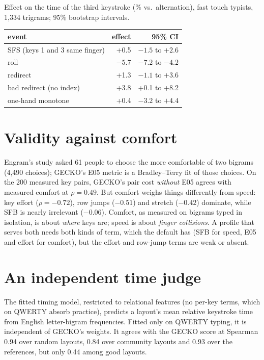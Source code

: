 \documentclass{gecko-paper}
\begin{document}
\begin{paperbody}
\begin{papertable}{Effect on the time of the third keystroke (\% vs.\ alternation), fast touch typists, 1{,}334 trigrams; 95\% bootstrap intervals.}
\begin{tabular*}{\linewidth}{@{\extracolsep{\fill}}lrr@{}}
\toprule
event & effect & 95\% CI\\
\midrule
SFS (keys 1 and 3 same finger) & +0.5 & $-1.5$ to $+2.6$\\
roll & $-5.7$ & $-7.2$ to $-4.2$\\
redirect & +1.3 & $-1.1$ to $+3.6$\\
bad redirect (no index) & +3.8 & +0.1 to +8.2\\
one-hand monotone & +0.4 & $-3.2$ to $+4.4$\\
\bottomrule
\end{tabular*}
\end{papertable}

\section{Validity against comfort}
Engram's study  asked 61 people to choose the more comfortable of two bigrams (4{,}490 choices); GECKO's E05 metric is a Bradley–Terry fit of those choices. On the 200 measured key pairs, GECKO's pair cost \emph{without} E05 agrees with measured comfort at $\rho=0.49$. But comfort weighs things differently from speed: key effort ($\rho=-0.72$), row jumps ($-0.51$) and stretch ($-0.42$) dominate, while SFB is nearly irrelevant ($-0.06$). Comfort, as measured on bigrams typed in isolation, is about \emph{where} keys are; speed is about \emph{finger collisions}. A profile that serves both needs both kinds of term, which the default has (SFB for speed, E05 and effort for comfort), but the effort and row-jump terms are weak or absent.

\section{An independent time judge}
The fitted timing model, restricted to relational features (no per-key terms, which on QWERTY absorb practice), predicts a layout's mean relative keystroke time from English letter-bigram frequencies. Fitted only on QWERTY typing, it is independent of GECKO's weights. It agrees with the GECKO score at Spearman 0.94 over random layouts, 0.84 over community layouts and 0.93 over the references, but only 0.44 among good layouts.


\end{paperbody}
\end{document}
